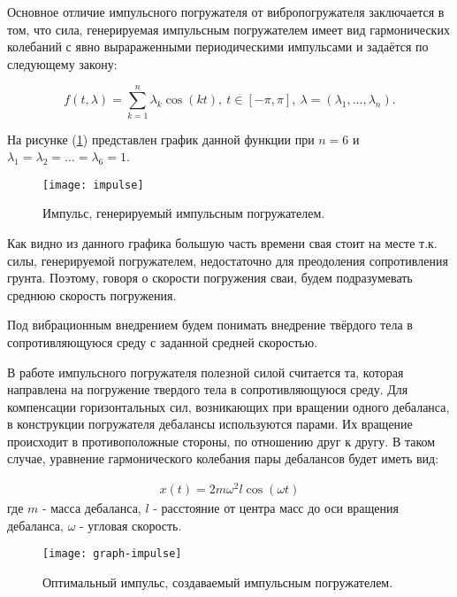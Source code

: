 \noindent Основное отличие импульсного погружателя от вибропогружателя заключается в том, что сила, генерируемая
импульсным погружателем имеет вид гармонических колебаний с явно вырараженными периодическими импульсами и задаётся
по следующему закону:

\begin{equation}
    f(t,\lambda)=\sum_{k=1}^n \lambda_k\cos(kt),\ t\in [-\pi,\pi],\ \lambda =(\lambda_1, \ldots,\lambda_n).
\end{equation}

\noindent На рисунке (\ref{fig:impulse}) представлен график данной функции при $n = 6$ и
$\lambda_1 = \lambda_2 = \ldots = \lambda_6 = 1$.

\begin{figure}[ht]
    \centering
    \texttt{[image: impulse]}
    \caption{Импульс, генерируемый импульсным погружателем.}
    \label{fig:impulse}
\end{figure}

\noindent Как видно из данного графика большую часть времени свая стоит на месте т.к. силы, генерируемой погружателем,
недостаточно для преодоления сопротивления грунта. Поэтому, говоря о скорости погружения сваи, будем подразумевать среднюю
скорость погружения.

\begin{definition}
    Под вибрационным внедрением будем понимать внедрение твёрдого тела в сопротивляющуюся среду с заданной
    средней скоростью.
\end{definition}

В работе импульсного погружателя полезной силой считается та, которая направлена на погружение твердого тела в
сопротивляющуюся среду. Для компенсации горизонтальных сил, возникающих при вращении одного дебаланса,
в конструкции погружателя дебалансы используются парами. Их вращение происходит в противоположные стороны, по отношению друг
к другу. В таком случае, уравнение гармонического колебания пары дебалансов будет иметь вид:

\begin{equation}
    \begin{aligned}
        x(t) = 2 m \omega^2 l \cos (\omega t)
    \end{aligned}
\end{equation}
\noindent где $m$ - масса дебаланса, $l$ - расстояние от центра масс до оси вращения дебаланса, $\omega$ - угловая скорость.

\begin{figure}[ht]
    \centering
    \texttt{[image: graph-impulse]}
    \caption{Оптимальный импульс, создаваемый импульсным погружателем.}
    \label{fig:graph-impulse}
\end{figure}


